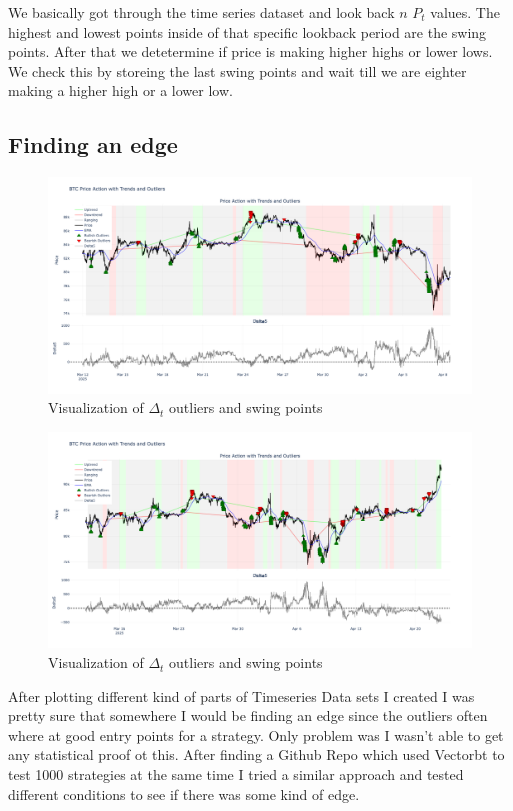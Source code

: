 \documentclass[12pt]{article}
\begin{document}
We basically got through the time series dataset and look back $n$ $P_t$ values. The highest and lowest points inside of that specific lookback period are the swing points. After that we detetermine if price is making higher highs or lower lows. We check this by storeing the last swing points and wait till we are eighter making a higher high or a lower low.



\subsection{Finding an edge}

\begin{figure}[H]
  \centering
  \includegraphics[width=\textwidth]{imgs/plotting_of_my_idea.png}
  \caption{Visualization of $\Delta_t$ outliers and swing points}
\end{figure}
\begin{figure}[H]
  \centering
  \includegraphics[width=\textwidth]{imgs/v2_plotting my idea.png}
  \caption{Visualization of $\Delta_t$ outliers and swing points}
\end{figure}

After plotting different kind of parts of Timeseries Data sets I created I was pretty sure that somewhere I would be finding an edge since the outliers often where at good entry points for a strategy. Only problem was I wasn't able to get any statistical proof ot this.
After finding a Github Repo which used Vectorbt to test 1000 strategies at the same time I tried a similar approach and tested different conditions to see if there was some kind of edge.
\end{document}

